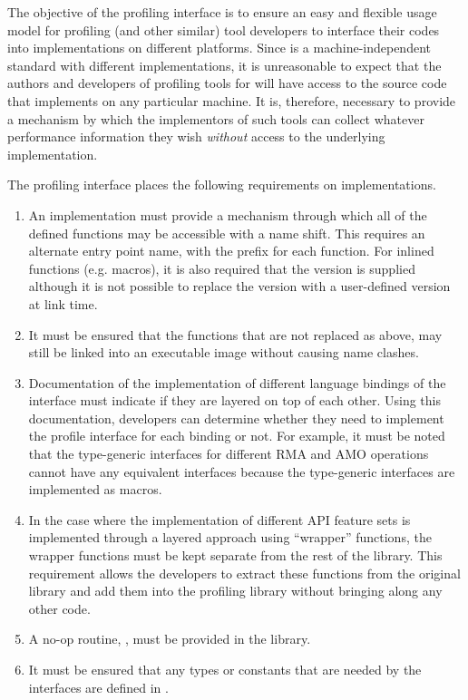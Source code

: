 The objective of the \openshmem profiling interface is to ensure an 
easy and flexible usage model for profiling (and other similar) 
tool developers to interface their codes into \openshmem 
implementations on different platforms. Since \openshmem is a 
machine-independent standard with different implementations, it is 
unreasonable to expect that the authors and developers of profiling 
tools for \openshmem will have access to the source code that 
implements \openshmem on any particular machine. It is, therefore,  
necessary to provide a mechanism by which the implementors of such 
tools can collect whatever performance information they wish 
\emph{without} access to the underlying implementation.

The \openshmem profiling interface places the following requirements 
on implementations. 

\begin{enumerate}
\item An \openshmem implementation must provide a mechanism through 
which all of the \openshmem defined functions may be accessible 
with a name shift. This requires an alternate 
entry point name, with the prefix  for each 
\openshmem function. For \openshmem inlined functions (e.g. macros), 
it is also required that the  version is supplied 
although it is not possible to replace the  version 
with a user-defined version at link time.
\item It must be ensured that the \openshmem functions that are not 
replaced as above, may still be linked into an executable image 
without causing name clashes. 
\item Documentation of the implementation of different language 
bindings of the \openshmem interface must indicate if they 
are layered on top of each other. Using this documentation,   
developers can determine whether they need to implement the 
profile interface for each binding or not. For example, it must 
be noted that the \openshmem \Cstd[11] type-generic interfaces for 
different RMA and AMO operations cannot have any equivalent 
 interfaces because the \Cstd[11] type-generic 
interfaces are implemented as macros.
\item In the case where the implementation of different API  
feature sets is implemented through a layered approach using 
``wrapper'' functions, the wrapper functions must be kept separate 
from the rest of the library. This requirement allows the developers 
to extract these functions from the original \openshmem library 
and add them into the profiling library without bringing along any 
other code.
\item A no-op routine, , must be provided 
in the \openshmem library.
\item It must be ensured that any \openshmem types or constants that are 
needed by the  interfaces are defined in .
\end{enumerate}

